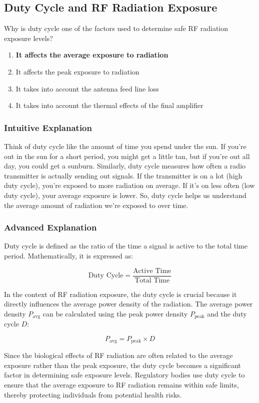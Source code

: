 \subsection{Duty Cycle and RF Radiation Exposure}
\label{T0C10}

\begin{tcolorbox}[colback=gray!10!white,colframe=black!75!black,title=T0C10]
Why is duty cycle one of the factors used to determine safe RF radiation exposure levels?
\begin{enumerate}[noitemsep]
    \item \textbf{It affects the average exposure to radiation}
    \item It affects the peak exposure to radiation
    \item It takes into account the antenna feed line loss
    \item It takes into account the thermal effects of the final amplifier
\end{enumerate}
\end{tcolorbox}

\subsubsection*{Intuitive Explanation}
Think of duty cycle like the amount of time you spend under the sun. If you're out in the sun for a short period, you might get a little tan, but if you're out all day, you could get a sunburn. Similarly, duty cycle measures how often a radio transmitter is actually sending out signals. If the transmitter is on a lot (high duty cycle), you're exposed to more radiation on average. If it's on less often (low duty cycle), your average exposure is lower. So, duty cycle helps us understand the average amount of radiation we're exposed to over time.

\subsubsection*{Advanced Explanation}
Duty cycle is defined as the ratio of the time a signal is active to the total time period. Mathematically, it is expressed as:

\[
\text{Duty Cycle} = \frac{\text{Active Time}}{\text{Total Time}}
\]

In the context of RF radiation exposure, the duty cycle is crucial because it directly influences the average power density of the radiation. The average power density \( P_{\text{avg}} \) can be calculated using the peak power density \( P_{\text{peak}} \) and the duty cycle \( D \):

\[
P_{\text{avg}} = P_{\text{peak}} \times D
\]

Since the biological effects of RF radiation are often related to the average exposure rather than the peak exposure, the duty cycle becomes a significant factor in determining safe exposure levels. Regulatory bodies use duty cycle to ensure that the average exposure to RF radiation remains within safe limits, thereby protecting individuals from potential health risks.